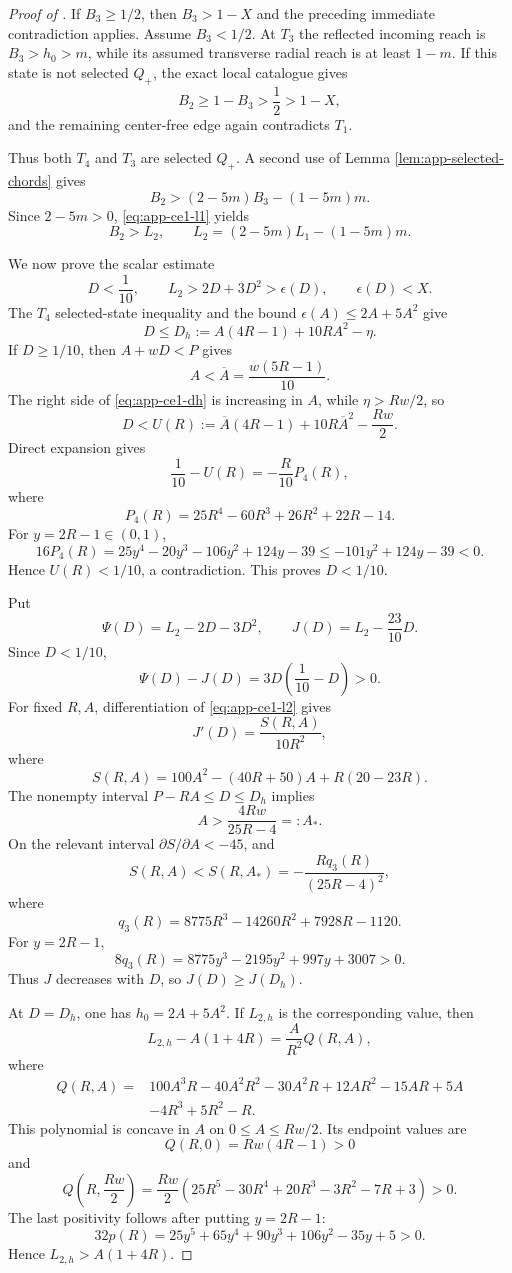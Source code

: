 \begin{proof}[Proof of ]
If $B_3\ge1/2$, then $B_3>1-X$ and the preceding immediate contradiction
applies.  Assume $B_3<1/2$.  At $T_3$ the reflected incoming reach is
$B_3>h_0>m$, while its assumed transverse radial reach is at least $1-m$.  If this state is
not selected $Q_+$, the exact local catalogue gives
\[
 B_2\ge1-B_3>\frac12>1-X,
\]
and the remaining center-free edge again contradicts $T_1$.

Thus both $T_4$ and $T_3$ are selected $Q_+$.  A second use of Lemma
\ref{lem:app-selected-chords} gives
\[
 B_2>(2-5m)B_3-(1-5m)m.
\]
Since $2-5m>0$, \eqref{eq:app-ce1-l1} yields
\[
 \boxed{
 B_2>L_2,
 \qquad
 L_2=(2-5m)L_1-(1-5m)m.
 }
 \label{eq:app-ce1-l2}
\]

We now prove the scalar estimate
\[
 \boxed{
 D<\frac1{10},
 \qquad
 L_2>2D+3D^2>\epsilon(D),
 \qquad
 \epsilon(D)<X.
 }
 \label{eq:app-ce1-scalar-estimate}
\]
The $T_4$ selected-state inequality and the bound
$\epsilon(A)\le2A+5A^2$ give
\[
 D\le D_h:=A(4R-1)+10RA^2-\eta.
 \label{eq:app-ce1-dh}
\]
If $D\ge1/10$, then $A+wD<P$ gives
\[
 A<\overline A=\frac{w(5R-1)}{10}.
\]
The right side of \eqref{eq:app-ce1-dh} is increasing in $A$, while
$\eta>Rw/2$, so
\[
 D<U(R):=\overline A(4R-1)+10R\overline A^2-\frac{Rw}{2}.
\]
Direct expansion gives
\[
 \frac1{10}-U(R)=-\frac R{10}P_4(R),
\]
where
\[
 P_4(R)=25R^4-60R^3+26R^2+22R-14.
\]
For $y=2R-1\in(0,1)$,
\[
 16P_4(R)
 =25y^4-20y^3-106y^2+124y-39
 \le-101y^2+124y-39<0.
\]
Hence $U(R)<1/10$, a contradiction.  This proves $D<1/10$.

Put
\[
 \Psi(D)=L_2-2D-3D^2,
 \qquad
 J(D)=L_2-\frac{23}{10}D.
\]
Since $D<1/10$,
\[
 \Psi(D)-J(D)=3D\left(\frac1{10}-D\right)>0.
\]
For fixed $R,A$, differentiation of \eqref{eq:app-ce1-l2} gives
\[
 J'(D)=\frac{S(R,A)}{10R^2},
\]
where
\[
 S(R,A)=100A^2-(40R+50)A+R(20-23R).
\]
The nonempty interval $P-RA\le D\le D_h$ implies
\[
 A>\frac{4Rw}{25R-4}=:A_*.
\]
On the relevant interval $\partial S/\partial A<-45$, and
\[
 S(R,A)<S(R,A_*)
 =-\frac{Rq_3(R)}{(25R-4)^2},
\]
where
\[
 q_3(R)=8775R^3-14260R^2+7928R-1120.
\]
For $y=2R-1$,
\[
 8q_3(R)=8775y^3-2195y^2+997y+3007>0.
\]
Thus $J$ decreases with $D$, so $J(D)\ge J(D_h)$.

At $D=D_h$, one has $h_0=2A+5A^2$.  If $L_{2,h}$ is the corresponding value,
then
\[
 L_{2,h}-A(1+4R)=\frac{A}{R^2}Q(R,A),
\]
where
\begin{align*}
Q(R,A)={}&100A^3R-40A^2R^2-30A^2R+12AR^2-15AR+5A\\
&-4R^3+5R^2-R.
\end{align*}
This polynomial is concave in $A$ on $0\le A\le Rw/2$.  Its endpoint values
are
\[
 Q(R,0)=Rw(4R-1)>0
\]
and
\[
 Q\left(R,\frac{Rw}{2}\right)
 =\frac{Rw}{2}
 (25R^5-30R^4+20R^3-3R^2-7R+3)>0.
\]
The last positivity follows after putting $y=2R-1$:
\[
32p(R)=25y^5+65y^4+90y^3+106y^2-35y+5>0.
\]
Hence $L_{2,h}>A(1+4R)$.


\end{proof}
